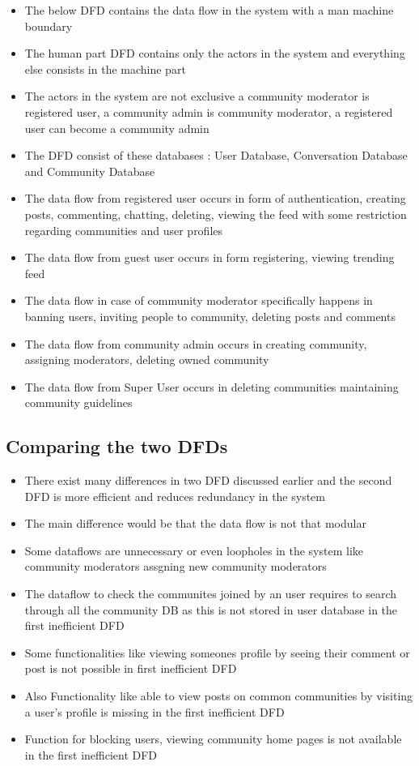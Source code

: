 \documentclass[11pt]{article}
\begin{document}
\begin{itemize}
    \item The below DFD contains the data flow in the system with a man machine boundary
    \item The human part DFD contains only the actors in the system and everything else consists in the machine part
    \item The actors in the system are not exclusive a community moderator is registered user, a community admin is community moderator, a registered user can become a community admin
    \item The DFD consist of these databases : User Database, Conversation Database and Community Database
    \item The data flow from registered user occurs in form of authentication, creating posts, commenting, chatting, deleting, viewing the feed with some restriction regarding communities and user profiles
    \item The data flow from guest user occurs in form registering, viewing trending feed
    \item The data flow in case of community moderator specifically happens in banning users, inviting people to community, deleting posts and comments
    \item The data flow from community admin occurs in creating community, assigning moderators, deleting owned community
    \item The data flow from Super User occurs in deleting communities maintaining community guidelines
\end{itemize}
\subsection{Comparing the two DFDs}
\begin{itemize}
    \item There exist many differences in two DFD discussed earlier and the second DFD is more efficient and reduces redundancy in the system
    \item The main difference would be that the data flow is not that modular
    \item Some dataflows are unnecessary or even loopholes in the system like community moderators assgning new community moderators
    \item The dataflow to check the communites joined by an user requires to search through all the community DB as this is not stored in user database in the first inefficient DFD
    \item Some functionalities like viewing someones profile by seeing their comment or post is not possible in first inefficient DFD
    \item Also Functionality like able to view posts on common communities by visiting a user's profile is missing in the first inefficient DFD
    \item Function for blocking users, viewing community home pages is not available in the first inefficient DFD
\end{itemize}
\end{document}

